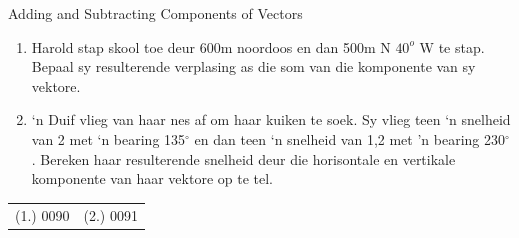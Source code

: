 \begin{exercises}{Adding and Subtracting Components of Vectors}
\noindent\vspace{-1cm}
\begin{enumerate}[noitemsep, label=\textbf{\arabic*}.]
\item Harold stap skool toe deur 600m noordoos en dan 500m N $40^o$ W te stap. Bepaal sy resulterende verplasing as die som van die komponente van sy vektore.
\item ‘n Duif vlieg van haar nes af om haar kuiken te soek. Sy vlieg teen ‘n snelheid van 2 \ms met ‘n bearing 135${^\circ}$ en dan teen ‘n snelheid van 1,2 \ms met 'n bearing 230${^\circ}$. Bereken haar resulterende snelheid deur die horisontale en vertikale komponente van haar vektore op te tel.
\end{enumerate}

\par \practiceinfo
 \par \begin{tabular}[h]{cc}
 (1.) 0090  &  (2.) 0091   & \end{tabular}
\end{exercises}

